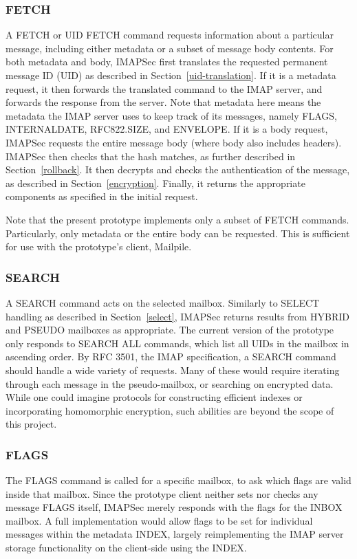 \documentclass[pageno]{jpaper}
\newcommand{\project}{IMAPSec }
\begin{document}
\subsubsection{FETCH} A FETCH or UID FETCH command requests information about a particular message, including either metadata or a subset of message body contents. For both metadata and body, \project first translates the requested permanent message ID (UID) as described in Section~\ref{uid-translation}. If it is a metadata request, it then forwards the translated command to the IMAP server, and forwards the response from the server. Note that metadata here means the metadata the IMAP server uses to keep track of its messages, namely FLAGS, INTERNALDATE, RFC822.SIZE, and ENVELOPE. If it is a body request, \project requests the entire message body (where body also includes headers). \project then checks that the hash matches, as further described in Section~\ref{rollback}. It then decrypts and checks the authentication of the message, as described in Section~\ref{encryption}. Finally, it returns the appropriate components as specified in the initial request.


Note that the present prototype implements only a subset of FETCH commands. Particularly, only metadata or the entire body can be requested. This is sufficient for use with the prototype's client, Mailpile.

\subsubsection{SEARCH} A SEARCH command acts on the selected mailbox. Similarly to SELECT handling as described in Section~\ref{select}, \project returns results from HYBRID and PSEUDO mailboxes as appropriate. The current version of the prototype only responds to SEARCH ALL commands, which list all UIDs in the mailbox in ascending order. By RFC 3501, the IMAP specification, a SEARCH command should handle a wide variety of requests. Many of these would require iterating through each message in the pseudo-mailbox, or searching on encrypted data. While one could imagine protocols for constructing efficient indexes or incorporating homomorphic encryption, such abilities are beyond the scope of this project.

\subsubsection{FLAGS} The FLAGS command is called for a specific mailbox, to ask which flags are valid inside that mailbox. Since the prototype client neither sets nor checks any message FLAGS itself, \project merely responds with the flags for the INBOX mailbox. A full implementation would allow flags to be set for individual messages within the metadata INDEX, largely reimplementing the IMAP server storage functionality on the client-side using the INDEX.
\end{document}
